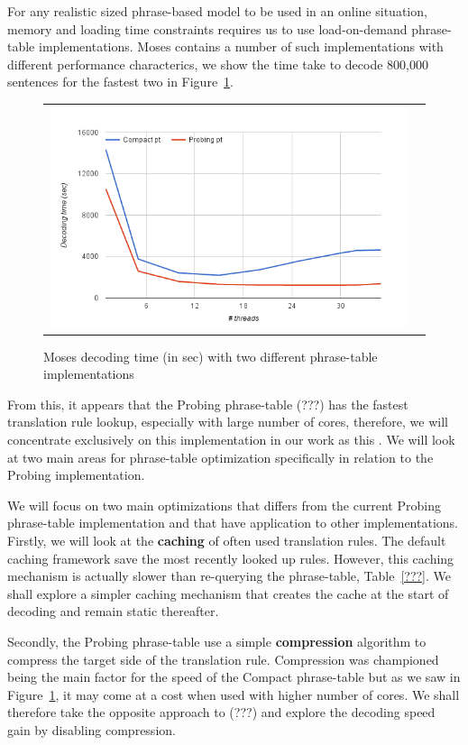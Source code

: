 \documentclass[11pt]{article}
\begin{document}
For any realistic sized phrase-based model to be used in an online situation, memory and loading time constraints requires us to use load-on-demand phrase-table implementations. Moses contains a number of such implementations with different performance characterics, we show the time take to decode 800,000 sentences for the fastest two in Figure~\ref{fig:moses-phrase-tables-time}.
\begin{figure}[h]
\centering
\begin{tabular}{cc}
{\includegraphics[scale=0.4]{moses-phrase-table.png}} 
\end{tabular}
\caption{Moses decoding time (in sec) with two different phrase-table implementations}
\label{fig:moses-phrase-tables-time}
\end{figure} 
From this, it appears that the Probing phrase-table (???) has the fastest translation rule lookup, especially with large number of cores, therefore, we will concentrate exclusively on this implementation in our work as this . We will look at two main areas for phrase-table optimization specifically in relation to the Probing implementation.

We will focus on two main optimizations that differs from the current Probing phrase-table implementation and that have application to other implementations. Firstly, we will look at the \textbf{caching} of often used translation rules. The default caching framework save the most recently looked up rules. However, this caching mechanism is actually slower than re-querying the phrase-table, Table~\ref{???}. We shall explore a simpler caching mechanism that creates the cache at the start of decoding and remain static thereafter.

Secondly, the Probing phrase-table use a simple \textbf{compression} algorithm to compress the target side of the translation rule. Compression was championed being the main factor for the speed of the Compact phrase-table but as we saw in Figure~\ref{fig:moses-phrase-tables-time}, it may come at a cost when used with higher number of cores. We shall therefore take the opposite approach to (???) and explore the decoding speed gain by disabling compression.
\end{document}
